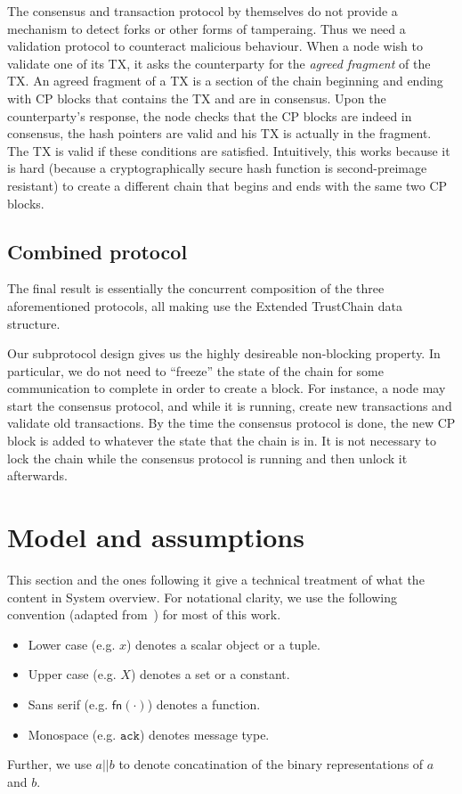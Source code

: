 The consensus and transaction protocol by themselves do not provide a mechanism to detect forks or other forms of tamperaing.
Thus we need a validation protocol to counteract malicious behaviour.
When a node wish to validate one of its TX, it asks the counterparty for the \emph{agreed fragment} of the TX.
An agreed fragment of a TX is a section of the chain beginning and ending with CP blocks that contains the TX and are in consensus.
Upon the counterparty's response, the node checks that the CP blocks are indeed in consensus,
the hash pointers are valid and his TX is actually in the fragment.
The TX is valid if these conditions are satisfied.
Intuitively, this works because it is hard (because a cryptographically secure hash function is second-preimage resistant)
to create a different chain that begins and ends with the same two CP blocks.


\subsection{Combined protocol}
\label{sec:combined-protocol}
The final result is essentially the concurrent composition of the three aforementioned protocols,
all making use the Extended TrustChain data structure.

Our subprotocol design gives us the highly desireable non-blocking property.
In particular, we do not need to ``freeze'' the state of the chain for some communication to complete in order to create a block.
For instance, a node may start the consensus protocol, and while it is running, create new transactions and validate old transactions.
By the time the consensus protocol is done, the new CP block is added to whatever the state that the chain is in.
It is not necessary to lock the chain while the consensus protocol is running and then unlock it afterwards.

\section{Model and assumptions}
\label{sec:model-assumptions}

This section and the ones following it give a technical treatment of what the content in System overview.
For notational clarity, we use the following convention (adapted from~\cite{miller2016honey}) for most of this work.
\begin{itemize}
\item Lower case (e.g. $x$) denotes a scalar object or a tuple.
\item Upper case (e.g. $X$) denotes a set or a constant.
\item Sans serif (e.g. $\textsf{fn}(\cdot)$) denotes a function.
\item Monospace (e.g. $\texttt{ack}$) denotes message type.
\end{itemize}
Further, we use $a || b$ to denote concatination of the binary representations of $a$ and $b$.

